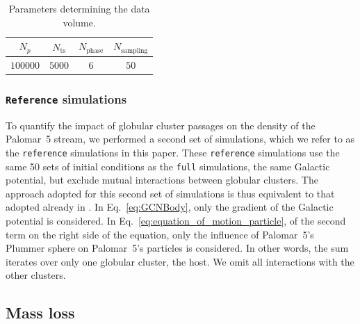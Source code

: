             \begin{center}
                \begin{table}[h]
                    \centering
                    \caption{Parameters determining the data volume.}
                    \label{tab:data_volume}
                    \begin{tabular}{|c|c|c|c|}
                        \hline
                        $N_p$ & $N_{\textrm{ts}}$ & $N_{\textrm{phase}}$ & $N_{\textrm{sampling}}$ \\
                        \hline
                        $100000$ & $5000$ & $6$ & $50$ \\
                        \hline
                    \end{tabular}
                \end{table}
            \end{center}

        \subsubsection{ \texttt{Reference} simulations}
        To quantify the impact of globular cluster passages on the density of the Palomar~5 stream, we performed a second set of simulations, which we refer to as the \texttt{reference} simulations in this paper.  These \texttt{reference} simulations use the same 50 sets of initial conditions as the \texttt{full} simulations, the same Galactic potential, but exclude mutual interactions between globular clusters. The approach adopted for this second set of simulations is thus equivalent to that adopted already in \citet{2023A&A...673A..44F}. In Eq.~\ref{eq:GCNBody}, only the gradient of the Galactic potential is considered. In Eq.~\ref{eq:equation_of_motion_particle}, of the second term on the right side of the equation, only the influence of Palomar~5's Plummer sphere on Palomar~5's particles is considered. In other words, the sum iterates over only one globular cluster, the host. We omit all interactions with the other clusters.
    \subsection{Mass loss}\label{sec:mass_loss}

